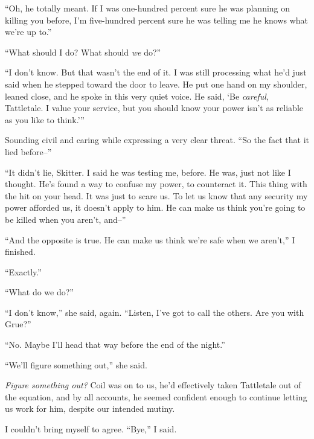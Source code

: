 ``Oh, he totally meant.  If I was one-hundred percent sure he was planning on killing you before, I'm five-hundred percent sure he was telling me he knows what we're up to.''



``What should I do?  What should \emph{we} do?''



``I don't know.  But that wasn't the end of it.  I was still processing what he'd just said when he stepped toward the door to leave.  He put one hand on my shoulder, leaned close, and he spoke in this very quiet voice.  He said, `Be \emph{careful}, Tattletale.  I value your service, but you should know your power isn't as reliable as you like to think.'''



Sounding civil and caring while expressing a very clear threat.  ``So the fact that it lied before--''



``It didn't lie, Skitter.  I said he was testing me, before.  He was, just not like I thought.  He's found a way to confuse my power, to counteract it.  This thing with the hit on your head.  It was just to scare us.  To let us know that any security my power afforded us, it doesn't apply to him.  He can make us think you're going to be killed when you aren't, and--''



``And the opposite is true.  He can make us think we're safe when we aren't,'' I finished.



``Exactly.''



``What do we do?''



``I don't know,'' she said, again.  ``Listen, I've got to call the others.  Are you with Grue?''



``No.  Maybe I'll head that way before the end of the night.''



``We'll figure something out,'' she said.



\emph{Figure something out?}  Coil was on to us, he'd effectively taken Tattletale out of the equation, and by all accounts, he seemed confident enough to continue letting us work for him, despite our intended mutiny.



I couldn't bring myself to agree.  ``Bye,'' I said.



